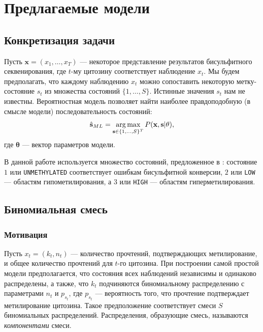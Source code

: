 
\section{Предлагаемые модели}
\label{sec:models}

\subsection{Конкретизация задачи}

Пусть $\mathbf{x} = (x_1, \ldots, x_T)$ --- некоторое представление результатов
бисульфитного секвенирования, где $t$-му цитозину соответствует наблюдение $x_t$.
Мы будем предполагать, что каждому наблюдению $x_t$ можно сопоставить некоторую
метку-состояние $s_t$ из множества состояний $\{1, \ldots, S\}$. Истинные значения
$s_t$ нам не известны. Вероятностная модель позволяет найти наиболее правдоподобную
(в смысле модели) последовательность состояний:
$$
\hat{\mathbf{s}}_{ML}
= \operatorname*{arg\,max}\limits_{\mathbf{s} \in \{1, \ldots, S\}^T} P(\mathbf{x}, \mathbf{s}|\mathbf{\theta}),
$$
где $\mathbf{\theta}$ --- вектор параметров модели.

В данной работе используется множество состояний, предложенное в \cite{Stadler2011}:
состояние $1$ или \texttt{UNMETHYLATED} соответствует ошибкам бисульфитной конверсии,
$2$ или \texttt{LOW} --- областям гипометилирования, а $3$ или \texttt{HIGH} ---
областям гиперметилирования.

\subsection{Биномиальная смесь}

\subsubsection{Мотивация}

Пусть $x_t = (k_t, n_t)$ --- количество прочтений, подтверждающих метилирование,
и общее количество прочтений для $t$-го цитозина. При построении самой простой модели
предполагается, что состояния всех наблюдений независимы и одинаково распределены,
а также, что $k_t$ подчиняются биномиальному распределению с параметрами $n_t$ и $p_{s_t}$,
где $p_{s_t}$ --- вероятность того, что прочтение подтверждает метилирование цитозина.
Такое предположение соответствует смеси $S$ биномиальных распределений. Распределения,
образующие смесь, называются \emph{компонентами} смеси.

